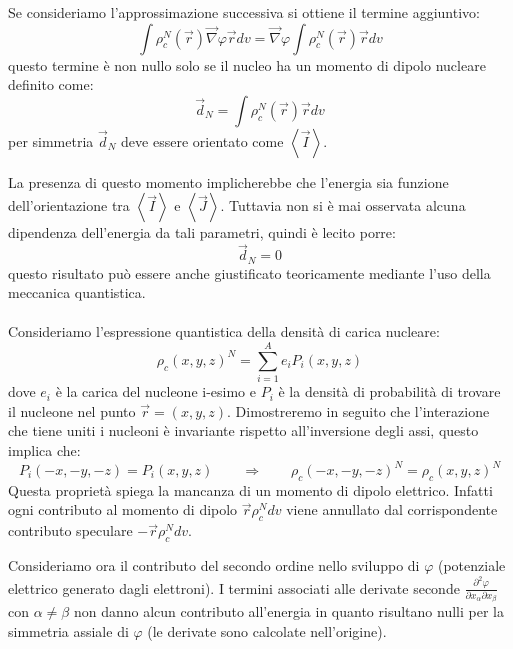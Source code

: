 Se consideriamo l'approssimazione successiva si ottiene il termine aggiuntivo:
\begin{equation}
\int \rho^{N}_c{(\vec{r})} \vec{\nabla} \varphi \vec{r} dv = \vec{\nabla} \varphi \int \rho^{N}_c{(\vec{r})} \vec{r} dv
\end{equation}
questo termine è non nullo solo se il nucleo ha un momento di dipolo nucleare definito come:
\begin{equation}
\vec{d}_N = \int \rho^{N}_c{(\vec{r})} \vec{r} dv
\end{equation}
per simmetria $\vec{d}_N$ deve essere orientato come $\left\langle \vec{I} \right\rangle$.

La presenza di questo momento implicherebbe che l'energia sia funzione
dell'orientazione tra $\left\langle \vec{I} \right\rangle$ e $\left\langle
\vec{J} \right\rangle$. Tuttavia non si è mai osservata alcuna dipendenza
dell'energia da tali parametri, quindi è lecito porre:
\begin{equation}
\vec{d}_N = 0
\end{equation}
questo risultato può essere anche giustificato teoricamente mediante l'uso della
meccanica quantistica.
\\
\\
Consideriamo l'espressione quantistica della densità di carica nucleare:
\begin{equation}
\rho_c{(x,y,z)}^N = \sum_{i=1}^A e_i P_i{(x,y,z)}
\end{equation}
dove $e_i$ è la carica del nucleone i-esimo e $P_i$ è la densità di probabilità
di trovare il nucleone nel punto $\vec{r} = (x,y,z)$.
Dimostreremo in seguito che l'interazione che tiene uniti i nucleoni è
invariante rispetto all'inversione degli assi, questo implica che:
\begin{equation}
P_i{(-x,-y,-z)} = P_i{(x,y,z)} \qquad \Rightarrow \qquad \rho_c{(-x,-y,-z)}^N = \rho_c{(x,y,z)}^N
\end{equation}
Questa proprietà spiega la mancanza di un momento di dipolo elettrico. Infatti
ogni contributo al momento di dipolo $\vec{r} \rho_c^N dv$ viene annullato dal
corrispondente contributo speculare $- \vec{r} \rho_c^N dv$.

Consideriamo ora il contributo del secondo ordine nello sviluppo di $\varphi$
(potenziale elettrico generato dagli elettroni). I termini associati alle
derivate seconde $\frac{\partial^2 \varphi}{\partial x_{\alpha} \partial
x_{\beta}}$ con $\alpha \ne \beta$ non danno alcun contributo all'energia in
quanto risultano nulli per la simmetria assiale di $\varphi$ (le derivate sono
calcolate nell'origine).

